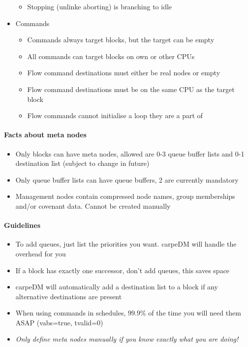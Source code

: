 \begin{itemize}
\begin{itemize}
    \item{Stopping (unlinke aborting) is branching to idle}
  \end{itemize}
  \item{Commands}
  \begin{itemize}
    \item{Commands always target blocks, but the target can be empty}
    \item{All commands can target blocks on own or other CPUs}
    \item{Flow command destinations must either be real nodes or empty}
    \item{Flow command destinations must be on the same CPU as the target block}
    \item{Flow commands cannot initialise a loop they are a part of}
\end{itemize}
\end{itemize}

\paragraph{Facts about meta nodes}
\begin{itemize}
  \item{Only blocks can have meta nodes, allowed are 0-3 queue buffer lists and 0-1 destination list (subject to change in future)}
  \item{Only queue buffer lists can have queue buffers, 2 are currently mandatory}
  \item{Management nodes contain compressed node names, group memberships and/or covenant data. Cannot be created manually}
\end{itemize}

\paragraph{Guidelines}
\begin{itemize}
  \item{To add queues, just list the priorities you want. carpeDM will handle the overhead for you}
  \item{If a block has exactly one successor, don't add queues, this saves space}
  \item{carpeDM will automatically add a destination list to a block if any alternative destinations are present}
  \item{When using commands in schedules, $99.9\%$ of the time you will need them ASAP (vabs=true, tvalid=0) }
  \item{\emph{Only define meta nodes manually if you know exactly what you are doing!}}
\end{itemize}

